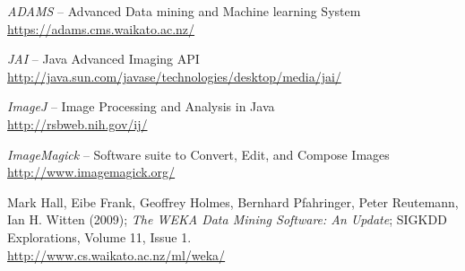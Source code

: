 %

\begin{thebibliography}{999}

		\textit{ADAMS} -- Advanced Data mining and Machine learning System \\
		\url{https://adams.cms.waikato.ac.nz/}{}

	 	\textit{JAI} -- Java Advanced Imaging API \\
		\url{http://java.sun.com/javase/technologies/desktop/media/jai/}{}

		\textit{ImageJ} -- Image Processing and Analysis in Java \\
		\url{http://rsbweb.nih.gov/ij/}{}

		\textit{ImageMagick} -- Software suite to Convert, Edit, and Compose Images \\
		\url{http://www.imagemagick.org/}{}

	 	Mark Hall, Eibe Frank, Geoffrey Holmes, Bernhard Pfahringer, Peter
	 	Reutemann, Ian H. Witten (2009); \textit{The WEKA Data Mining Software: An
	 	Update}; SIGKDD Explorations, Volume 11, Issue 1. \\
		\url{http://www.cs.waikato.ac.nz/ml/weka/}{}

\end{thebibliography}
